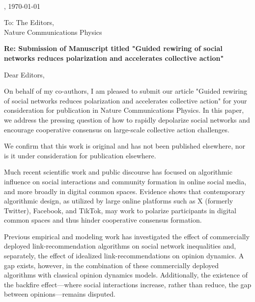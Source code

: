 \documentclass[a4paper,12pt]{letter}
\begin{document}
 \\
[Your Institution Name]

\vspace{0.5em}
, \today

\vspace{2em}


\vspace{1em}

\noindent
To: The Editors, \\
Nature Communications Physics

\vspace{1em}

\noindent
\textbf{Re: Submission of Manuscript titled "Guided rewiring of social networks reduces polarization and accelerates collective action"}

\vspace{1em}

\noindent
Dear Editors,

\vspace{0.5em}

On behalf of my co-authors, I am pleased to submit our article "Guided rewiring of social networks reduces polarization and accelerates collective action" for your consideration for publication in Nature Communications Physics. In this paper, we address the pressing question of how to rapidly depolarize social networks and encourage cooperative consensus on large-scale collective action challenges.

We confirm that this work is original and has not been published elsewhere, nor is it under consideration for publication elsewhere.

Much recent scientific work and public discourse has focused on algorithmic influence on social interactions and community formation in online social media, and more broadly in digital common spaces. Evidence shows that contemporary algorithmic design, as utilized by large online platforms such as X (formerly Twitter), Facebook, and TikTok, may work to polarize participants in digital common spaces and thus hinder cooperative consensus formation.

Previous empirical and modeling work has investigated the effect of commercially deployed link-recommendation algorithms on social network inequalities and, separately, the effect of idealized link-recommendations on opinion dynamics. A gap exists, however, in the combination of these commercially deployed algorithms with classical opinion dynamics models. Additionally, the existence of the backfire effect—where social interactions increase, rather than reduce, the gap between opinions—remains disputed.
\end{document}
